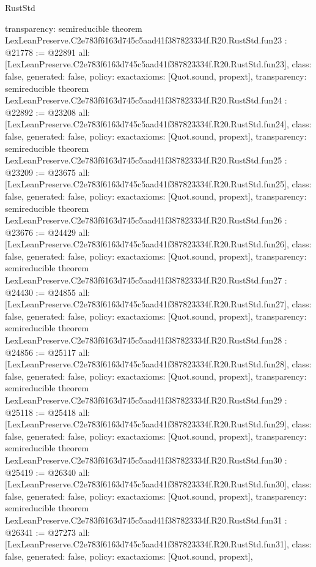 \begin{lexlean}{RustStd}
\begin{coremodule}
{  transparency: semireducible
}
theorem LexLeanPreserve.C2e783f6163d745c5aad41f387823334f.R20.RustStd.fun23 : @21778 := @22891 {
  all: [LexLeanPreserve.C2e783f6163d745c5aad41f387823334f.R20.RustStd.fun23],
  class: false,
  generated: false,
  policy: exact{axioms: [Quot.sound, propext]},
  transparency: semireducible
}
theorem LexLeanPreserve.C2e783f6163d745c5aad41f387823334f.R20.RustStd.fun24 : @22892 := @23208 {
  all: [LexLeanPreserve.C2e783f6163d745c5aad41f387823334f.R20.RustStd.fun24],
  class: false,
  generated: false,
  policy: exact{axioms: [Quot.sound, propext]},
  transparency: semireducible
}
theorem LexLeanPreserve.C2e783f6163d745c5aad41f387823334f.R20.RustStd.fun25 : @23209 := @23675 {
  all: [LexLeanPreserve.C2e783f6163d745c5aad41f387823334f.R20.RustStd.fun25],
  class: false,
  generated: false,
  policy: exact{axioms: [Quot.sound, propext]},
  transparency: semireducible
}
theorem LexLeanPreserve.C2e783f6163d745c5aad41f387823334f.R20.RustStd.fun26 : @23676 := @24429 {
  all: [LexLeanPreserve.C2e783f6163d745c5aad41f387823334f.R20.RustStd.fun26],
  class: false,
  generated: false,
  policy: exact{axioms: [Quot.sound, propext]},
  transparency: semireducible
}
theorem LexLeanPreserve.C2e783f6163d745c5aad41f387823334f.R20.RustStd.fun27 : @24430 := @24855 {
  all: [LexLeanPreserve.C2e783f6163d745c5aad41f387823334f.R20.RustStd.fun27],
  class: false,
  generated: false,
  policy: exact{axioms: [Quot.sound, propext]},
  transparency: semireducible
}
theorem LexLeanPreserve.C2e783f6163d745c5aad41f387823334f.R20.RustStd.fun28 : @24856 := @25117 {
  all: [LexLeanPreserve.C2e783f6163d745c5aad41f387823334f.R20.RustStd.fun28],
  class: false,
  generated: false,
  policy: exact{axioms: [Quot.sound, propext]},
  transparency: semireducible
}
theorem LexLeanPreserve.C2e783f6163d745c5aad41f387823334f.R20.RustStd.fun29 : @25118 := @25418 {
  all: [LexLeanPreserve.C2e783f6163d745c5aad41f387823334f.R20.RustStd.fun29],
  class: false,
  generated: false,
  policy: exact{axioms: [Quot.sound, propext]},
  transparency: semireducible
}
theorem LexLeanPreserve.C2e783f6163d745c5aad41f387823334f.R20.RustStd.fun30 : @25419 := @26340 {
  all: [LexLeanPreserve.C2e783f6163d745c5aad41f387823334f.R20.RustStd.fun30],
  class: false,
  generated: false,
  policy: exact{axioms: [Quot.sound, propext]},
  transparency: semireducible
}
theorem LexLeanPreserve.C2e783f6163d745c5aad41f387823334f.R20.RustStd.fun31 : @26341 := @27273 {
  all: [LexLeanPreserve.C2e783f6163d745c5aad41f387823334f.R20.RustStd.fun31],
  class: false,
  generated: false,
  policy: exact{axioms: [Quot.sound, propext]},
}
\end{coremodule}
\end{lexlean}

